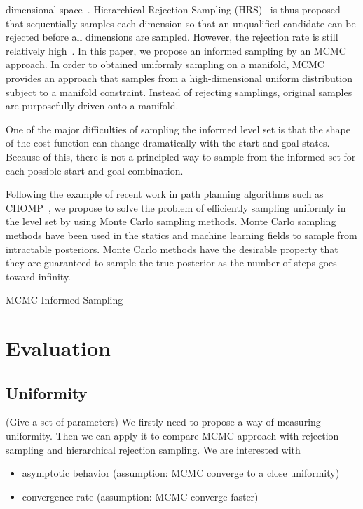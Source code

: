 \documentclass[letterpaper, 10 pt, conference]{ieeeconf}  %
\begin{document}
{dimensional space~\cite{KTC16}.
Hierarchical Rejection Sampling (HRS)~\cite{KTC16} is thus proposed that sequentially samples each dimension so that an unqualified candidate can be rejected before all dimensions are sampled. 
However, the rejection rate is still relatively high~\cite{KTC16}.
In this paper, we propose an informed sampling by an MCMC approach.
In order to obtained uniformly sampling on a manifold, MCMC provides an approach that samples from a high-dimensional uniform distribution subject to a manifold constraint.
Instead of rejecting samplings, original samples are purposefully driven onto a manifold.

One of the major difficulties of sampling the informed level set is that the shape of the cost function can change dramatically with the start and goal states. Because of this, there is not a principled way to sample from the informed set for each possible start and goal combination.  

Following the example of recent work in path planning algorithms such as CHOMP~\cite{RZBS09}, we propose to solve the problem of efficiently sampling uniformly in the level set by using Monte Carlo sampling methods. Monte Carlo sampling methods have been used in the statics and machine learning fields to sample from intractable posteriors. Monte Carlo methods have the desirable property that they are guaranteed to sample the true posterior as the number of steps goes toward infinity.


\begin{algorithm}
	\begin{algorithmic}[1]
		\STATE
   	\end{algorithmic}
	\caption{MCMC Informed Sampling}
	\label{alg:mcmc_informed_sampling}
\end{algorithm}
}

\section{Evaluation}
\label{sec:eval}

\subsection{Uniformity}

(Give a set of parameters)
We firstly need to propose a way of measuring uniformity.
Then we can apply it to compare MCMC approach with rejection sampling and hierarchical rejection sampling.
We are interested with
\begin{itemize}
	\item asymptotic behavior (assumption: MCMC converge to a close uniformity)
	\item convergence rate (assumption: MCMC converge faster)
\end{itemize}
\end{document}
